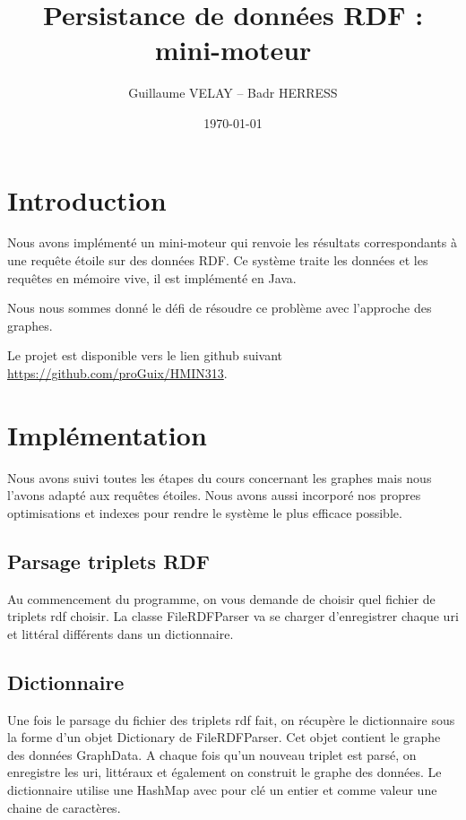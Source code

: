 \documentclass[12pt]{report}
\begin{document}
\title{Persistance de données RDF : mini-moteur}
\author{Guillaume VELAY -- Badr HERRESS}
\date{\today}

\maketitle

\tableofcontents
\newpage

\section{Introduction}
Nous avons implémenté un mini-moteur qui renvoie les résultats correspondants à une requête étoile sur des données RDF. Ce système traite les données et les requêtes en mémoire vive, il est implémenté en Java. 

Nous nous sommes donné le défi de résoudre ce problème avec l'approche des graphes.

Le projet est disponible vers le lien github suivant \url{https://github.com/proGuix/HMIN313}.

\section{Implémentation}

Nous avons suivi toutes les étapes du cours concernant les graphes mais nous l'avons adapté aux requêtes étoiles. Nous avons aussi incorporé nos propres optimisations et indexes pour rendre le système le plus efficace possible.

\subsection{Parsage triplets RDF}

Au commencement du programme, on vous demande de choisir quel fichier de triplets rdf choisir. La classe FileRDFParser va se charger d'enregistrer chaque uri et littéral différents dans un dictionnaire.

\subsection{Dictionnaire}

Une fois le parsage du fichier des triplets rdf fait, on récupère le dictionnaire sous la forme d'un objet Dictionary de FileRDFParser. Cet objet contient le graphe des données GraphData. A chaque fois qu'un nouveau triplet est parsé, on enregistre les uri, littéraux et également on construit le graphe des données.
Le dictionnaire utilise une HashMap avec pour clé un entier et comme valeur une chaine de caractères.
\end{document}
